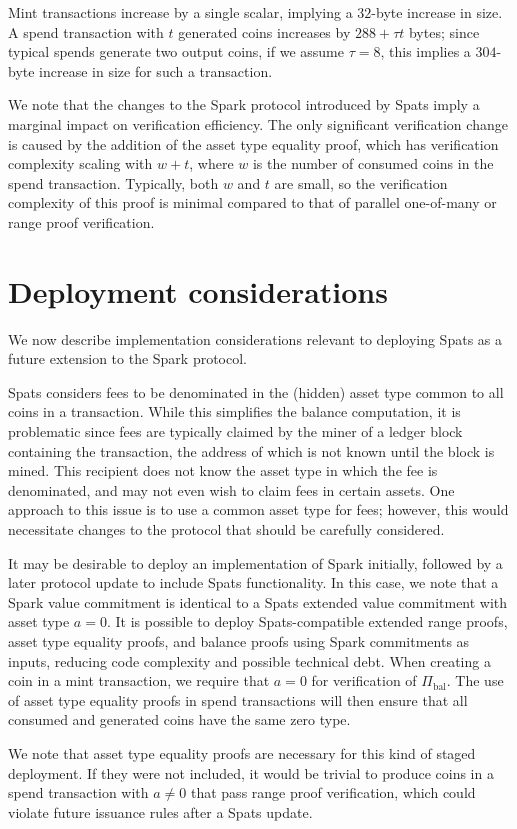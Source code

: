 \documentclass{article}
\begin{document}
Mint transactions increase by a single scalar, implying a $32$-byte increase in size.
A spend transaction with $t$ generated coins increases by $288 + \tau t$ bytes; since typical spends generate two output coins, if we assume $\tau = 8$, this implies a $304$-byte increase in size for such a transaction.

We note that the changes to the Spark protocol introduced by Spats imply a marginal impact on verification efficiency.
The only significant verification change is caused by the addition of the asset type equality proof, which has verification complexity scaling with $w + t$, where $w$ is the number of consumed coins in the spend transaction.
Typically, both $w$ and $t$ are small, so the verification complexity of this proof is minimal compared to that of parallel one-of-many or range proof verification.


\section{Deployment considerations}

We now describe implementation considerations relevant to deploying Spats as a future extension to the Spark protocol.

Spats considers fees to be denominated in the (hidden) asset type common to all coins in a transaction.
While this simplifies the balance computation, it is problematic since fees are typically claimed by the miner of a ledger block containing the transaction, the address of which is not known until the block is mined.
This recipient does not know the asset type in which the fee is denominated, and may not even wish to claim fees in certain assets.
One approach to this issue is to use a common asset type for fees; however, this would necessitate changes to the protocol that should be carefully considered.

It may be desirable to deploy an implementation of Spark initially, followed by a later protocol update to include Spats functionality.
In this case, we note that a Spark value commitment is identical to a Spats extended value commitment with asset type $a = 0$.
It is possible to deploy Spats-compatible extended range proofs, asset type equality proofs, and balance proofs using Spark commitments as inputs, reducing code complexity and possible technical debt.
When creating a coin in a mint transaction, we require that $a = 0$ for verification of $\Pi_{\text{bal}}$.
The use of asset type equality proofs in spend transactions will then ensure that all consumed and generated coins have the same zero type.

We note that asset type equality proofs are necessary for this kind of staged deployment.
If they were not included, it would be trivial to produce coins in a spend transaction with $a \neq 0$ that pass range proof verification, which could violate future issuance rules after a Spats update.
\end{document}
